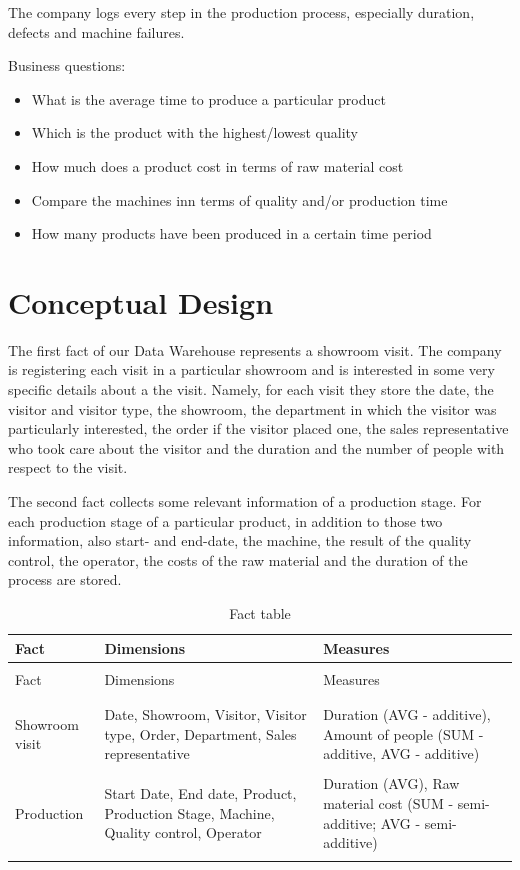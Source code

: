 \documentclass[letterpaper,12pt]{article}
\begin{document}
The company logs every step in the production process, especially duration, defects and machine failures.

Business questions:
\begin{itemize}
        \item What is the average time to produce a particular product
        \item Which is the product with the highest/lowest quality
        \item How much does a product cost in terms of raw material cost
				\item Compare the machines inn terms of quality and/or production time
				\item How many products have been produced in a certain time period
\end{itemize}

\section{Conceptual Design}

The first fact of our Data Warehouse represents a showroom visit. The company is registering each visit in a particular showroom and is interested in some very specific details about a the visit. Namely, for each visit they store the date, the visitor and visitor type, the showroom, the department in which the visitor was particularly interested, the order if the visitor placed one, the sales representative who took care about the visitor and the duration and the number of people with respect to the visit.

The second fact collects some relevant information of a production stage. For each production stage of a particular product, in addition to those two information, also start- and end-date, the machine, the result of the quality control, the operator, the costs of the raw material and the duration of the process are stored.

\begingroup
\renewcommand\arraystretch{0.5}
\begin{longtable}{p{3cm}p{6cm}p{4cm}}
        \caption{Fact table} \\
        Fact & Dimensions & Measures \\
        \endfirsthead \\
        Fact & Dimensions & Measures \\
        \endhead \\
        \hline \\
        Showroom visit & Date, Showroom, Visitor, Visitor type, Order, Department, Sales representative & Duration (AVG - additive), Amount of people (SUM - additive, AVG - additive) \\
        \hline \\
        Production & Start Date, End date, Product, Production Stage, Machine, Quality control, Operator & Duration (AVG), Raw material cost (SUM - semi-additive; AVG - semi-additive) \\
        \hline \\
\end{longtable}
\endgroup
\end{document}
